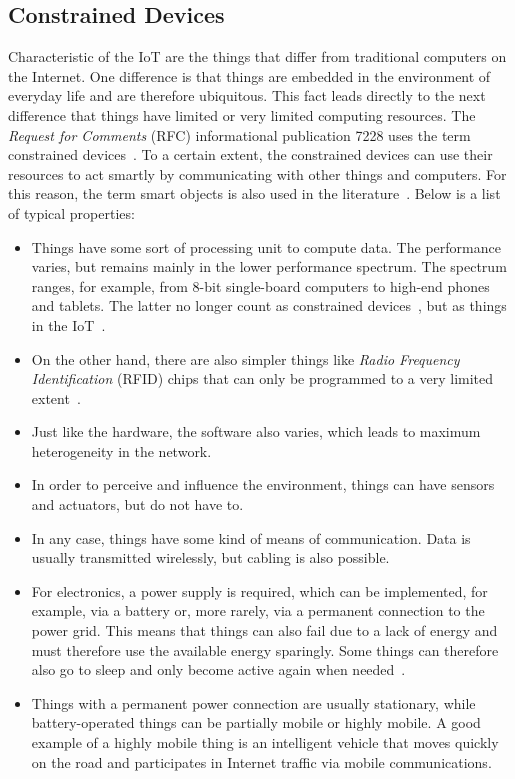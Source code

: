\documentclass[english,version-2019-11]{uzl-thesis}
\begin{document}
\subsection{Constrained Devices}
Characteristic of the IoT are the things that differ
from traditional computers on the Internet.
One difference is that things are embedded in the environment
of everyday life and are therefore ubiquitous.
This fact leads directly to the next difference that things
have limited or very limited computing resources.
The \emph{Request for Comments} (RFC) informational publication 7228 uses the term constrained devices~\cite{rfc7228}.
To a certain extent, the constrained devices can use their
resources to act smartly by communicating with
other things and computers. For this reason,
the term smart objects is also used in the literature~\cite{BookCisco}.
Below is a list of typical properties:
\begin{itemize}
\item Things have
some sort of processing unit to compute data.
The performance varies, but remains mainly in the lower
performance spectrum. The spectrum ranges, for example,
from 8-bit single-board computers to high-end phones and tablets.
The latter no longer count as constrained devices~\cite{rfc7228}, but as things in the IoT~\cite{BookCisco}.
\item On the other hand, there are also simpler things like
\emph{Radio Frequency Identification} (RFID) chips that can only be programmed
to a very limited extent~\cite{Tanenbaum}.
\item Just like the hardware,
the software also varies, which leads to maximum
heterogeneity in the network.
\item In order to perceive
and influence the environment, things can have
sensors and actuators, but do not have to.
\item In any case, things have some kind of means of
communication. Data is usually transmitted
wirelessly, but cabling is also possible.
\item For electronics, a power supply is required,
which can be implemented, for example,
via a battery or, more rarely, via a permanent
connection to the power grid. This means that things
can also fail due to a lack of energy and must
therefore use the available energy sparingly.
Some things can therefore also go to sleep and
only become active again when needed~\cite{TinyDB}.
\item Things
with a permanent power connection are usually stationary,
while battery-operated things can be partially
mobile or highly mobile. A good example of a highly
mobile thing is an intelligent vehicle that moves quickly
on the road and participates in Internet traffic
via mobile communications.
 \end{itemize}
\end{document}
